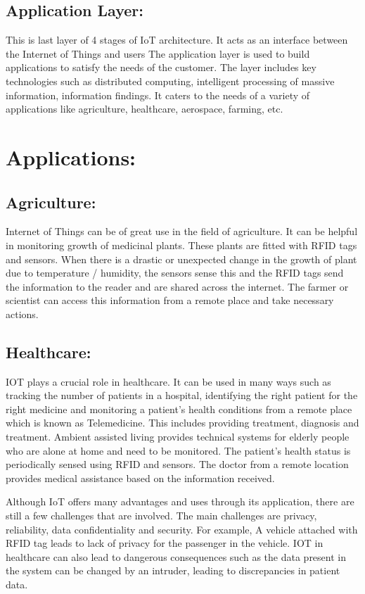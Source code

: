 \subsection{Application Layer:}
This is last layer of 4 stages of IoT architecture. It acts as an interface between the Internet of Things and users The application layer is used to build applications to satisfy the needs of the customer. The layer includes key technologies such as distributed computing, intelligent processing of massive information, information findings. It caters to the needs of a variety of applications like agriculture, healthcare, aerospace, farming, etc. 


\section{Applications:}

\subsection{Agriculture:}
Internet of Things can be of great use in the field of agriculture. It can be helpful in monitoring growth of medicinal plants. These plants are fitted with RFID tags and sensors. When there is a drastic or unexpected change in the growth of plant due to temperature / humidity, the sensors sense this and the RFID tags send the information to the reader and are shared across the internet. The farmer or scientist can access this information from a remote place and take necessary actions.

\subsection{Healthcare:}
IOT plays a crucial role in healthcare. It can be used in many ways such as tracking the number of patients in a hospital, identifying the right patient for the right medicine and monitoring a patient’s health conditions from a remote place which is known as Telemedicine. This includes providing treatment, diagnosis and treatment. Ambient assisted living provides technical systems for elderly people who are alone at home and need to be monitored. The patient’s health status is periodically sensed using RFID and sensors. The doctor from a remote location provides medical assistance based on the information received.

Although IoT offers many advantages and uses through its application, there are still a few challenges that are involved. The main challenges are privacy, reliability, data confidentiality and security. For example, A vehicle attached with RFID tag leads to lack of privacy for the passenger in the vehicle. IOT in healthcare can also lead to dangerous consequences such as the data present in the system can be changed by an intruder, leading to discrepancies in patient data.

